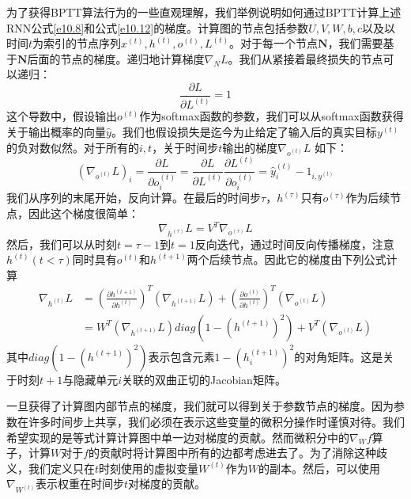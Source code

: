 \documentclass{ctexart}
\begin{document}
            为了获得BPTT算法行为的一些直观理解，我们举例说明如何通过BPTT计算上述RNN公式\ref{e10.8}和公式\ref{e10.12}的梯度。计算图的节点包括参数$U,V,W,b,c$以及以时间$t$为索引的节点序列$x^{(t)},h^{(t)},o^{(t)},L^{(t)}$。对于每一个节点$\textbf{N}$，我们需要基于$\textbf{N}$后面的节点的梯度。递归地计算梯度$\nabla_N L$。我们从紧接着最终损失的节点可以递归：
            \begin{equation}
                \frac{\partial L}{\partial L^{(t)}} = 1
                \label{e10.17}
            \end{equation}
            这个导数中，假设输出$o^{(t)}$作为softmax函数的参数，我们可以从softmax函数获得关于输出概率的向量$\hat{y}$。我们也假设损失是迄今为止给定了输入后的真实目标$y^{(t)}$的负对数似然。对于所有的$i,t$，关于时间步$t$输出的梯度$\nabla_{o^{(t)}} L$ 如下：
            \begin{equation}
                (\nabla_{o^{(t)}} L)_i = \frac{\partial L}{\partial o_i^{(t)}} = \frac{\partial L}{\partial L^{(t)}} \frac{\partial L^{(t)}}{\partial o_i^{(t)}} = \hat{y}_i^{(t)} - 1_{i,y^{(t)}}
                \label{e10.18}
            \end{equation}
            我们从序列的末尾开始，反向计算。在最后的时间步$\tau$，$h^{(\tau)}$只有$o^{(\tau)}$作为后续节点，因此这个梯度很简单：
            \begin{equation}
                \nabla_{h^{(\tau)}} L = V^T \nabla_{o^{(\tau)}} L
                \label{e10.19}
            \end{equation}
            然后，我们可以从时刻$t=\tau-1$到$t=1$反向迭代，通过时间反向传播梯度，注意$h^{(t)}(t<\tau)$同时具有$o^{(t)}$和$h^{(t+1)}$两个后续节点。因此它的梯度由下列公式计算
            \begin{equation}
                \begin{split}
                    \nabla_{h^{(t)}} L &= (\frac{\partial h^{(t+1)}}{\partial h^{(t)}})^T (\nabla_{h^{(t+1)}} L) + (\frac{\partial o^{(t)}}{\partial h^{(t)}})^T(\nabla_{o^{(t)}}L) \\
                    &=W^T(\nabla_{h^{(t+1)}}L) diag(1-(h^{(t+1)})^2) + V^T(\nabla_{o^{(t)}} L)
                \end{split}
                \label{e10.20}
            \end{equation}
            其中$diag(1-(h^{(t+1)})^2)$表示包含元素$1-(h_i^{(t+1)})^2$的对角矩阵。这是关于时刻$t+1$与隐藏单元$i$关联的双曲正切的Jacobian矩阵。

            一旦获得了计算图内部节点的梯度，我们就可以得到关于参数节点的梯度。因为参数在许多时间步上共享，我们必须在表示这些变量的微积分操作时谨慎对待。我们希望实现的是等式计算计算图中单一边对梯度的贡献。然而微积分中的$\nabla_W f$算子，计算$W$对于$f$的贡献时将计算图中所有的边都考虑进去了。为了消除这种歧义，我们定义只在$t$时刻使用的虚拟变量$W^{(t)}$作为$W$的副本。然后，可以使用$\nabla_{W^{(t)}}$表示权重在时间步$t$对梯度的贡献。
\end{document}
